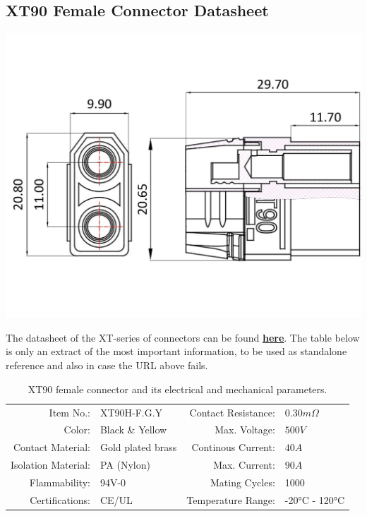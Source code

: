 \clearpage %

\subsection{XT90 Female Connector Datasheet}

\includegraphics[width=\textwidth]{contents/figures/xt90_f.jpg}

The datasheet of the XT-series of connectors can be found \href{https://www.lcsc.com/datasheet/lcsc_datasheet_2207061800_Changzhou-Amass-Elec-XT90H-F-G-Y_C3040685.pdf}{\textbf{\underline{here}}}.
The table below is only an extract of the most important information, to be used as standalone reference and also in case the URL above fails.

\begin{table}[h] %
    \begin{tabular}{rlrl}
         Item No.:&  XT90H-F.G.Y &  Contact Resistance:& $0.30m \Omega$\\
         Color:&  Black \& Yellow&  Max. Voltage:& $500V$\\
         Contact Material:&  Gold plated brass&  Continous Current:& $40A$\\
         Isolation Material:&  PA (Nylon)&  Max. Current:& $90A$\\
         Flammability:&  94V-0&  Mating Cycles:& 1000\\
         Certifications:&  CE/UL&  Temperature Range:& -20°C - 120°C\\
    \end{tabular}
    \caption{XT90 female connector and its electrical and mechanical parameters.}
    \label{xt90_f_specs}
\end{table}

